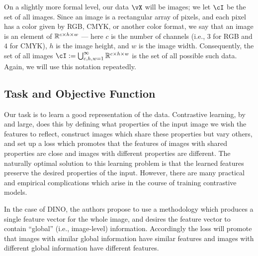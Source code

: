 \documentclass[../../book-main.tex]{subfiles}
\begin{document}
On a slightly more formal level, our data \(\vX\) will be images; we let \(\cI\) be the set of all images. Since an image is a rectangular array of pixels, and each pixel has a color given by RGB, CMYK, or another color format, we say that an image is an element of \(\mathbb{R}^{c \times h \times w}\) --- here \(c\) is the number of channels (i.e., \(3\) for RGB and \(4\) for CMYK), \(h\) is the image height, and \(w\) is the image width. Consequently, the set of all images \(\cI := \bigcup_{c, h, w = 1}^{\infty}\R^{c \times h \times w}\) is the set of all possible such data. Again, we will use this notation repeatedly.


\subsection{Task and Objective Function} \label{sub:contrastive_learning_objective}

Our task is to learn a good representation of the data. Contrastive learning, by and large, does this by defining what properties of the input image we wish the features to reflect, construct images which share these properties but vary others, and set up a loss which promotes that the features of images with shared properties are close and images with different properties are different. The naturally optimal solution to this learning problem is that the learned features preserve the desired properties of the input. However, there are many practical and empirical complications which arise in the course of training contrastive models.

In the case of DINO, the authors propose to use a methodology which produces a single feature vector for the whole image, and desires the feature vector to contain ``global'' (i.e., image-level) information. Accordingly the loss will promote that images with similar global information have similar features and images with different global information have different features.
\end{document}

